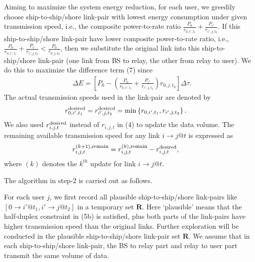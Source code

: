 \documentclass[journal]{IEEEtran}
\begin{document}
 Aiming to maximize the system energy reduction, for each user, we greedily choose ship-to-ship/shore link-pair with lowest energy consumption under given transmission speed, i.e., the composite power-to-rate ratio $ {\frac{{{P_0}}}{{{r_{0,i',{t_1}}}}} + \frac{{{P_{i'}}}}{{{r_{i',j,{t_2}}}}}} $. If this ship-to-ship/shore link-pair have lower composite power-to-rate ratio, i.e., $ {\frac{{{P_0}}}{{{r_{0,i',{t_1}}}}} + \frac{{{P_{i'}}}}{{{r_{i',j,{t_2}}}}}} < \frac{{{P_0}}}{{{r_{0,j,{t_0}}}}}$, then we substitute the original link into this ship-to-ship/shore link-pair (one link from BS to relay, the other from relay to user). We do this to maximize the difference term (7) since 
 \begin{align}
   &\Delta E  = \left[ {P_0}- \left( {\frac{{{P_0}}}{{{r_{0,i',{t_1}}}}} + \frac{{{P_{i'}}}}{{{r_{i',j,{t_2}}}}}} \right){r_{0,j,{t_0}}} \right] \Delta \tau.
 \end{align}
The actual transmission speeds used in the link-pair are denoted by 
\begin{align}
&r_{0,i',{t_1}}^{\rm{desired}}=r_{i',j,{t_2}}^{\rm{desired}}=\min \left\{ r_{0,i',{t_1}},r_{i',j,{t_2}} \right\}. 
\end{align}
We also used $r_{i,j,{t}}^{\rm{desired}}$ instead of $r_{i,j,{t}}$ in (4) to update the data volume. 
The remaining available transmission speed for any link $i \to j @ t$ is expressed as
\begin{align}
 &r_{i,j,{t}}^{\left( k+1 \right),\rm{remain}} = r_{i,j,{t}}^{\left( k \right),\rm{remain}} - r_{i,j,{t}}^{\rm{desired}}, 
\end{align}
where $\left( k \right)$ denotes the $k^{th}$ update for link $i \to j @ t$. 

 The algorithm in step-2 is carried out as follows.
 
 For each user $j$, we first record all plausible ship-to-ship/shore link-pairs like $\left[ {0 \to i'@{t_1},i' \to j@{t_2}} \right]$ in a temporary set $\mathbf{R}$. Here `plausible' means that the half-duplex constraint in (5b) 
 is satisfied, plus both parts of the link-pairs have higher transmission speed than the original links. Further exploration will be conducted in the plausible ship-to-ship/shore link-pair set $\mathbf{R}$. We assume that in each ship-to-ship/shore link-pair, the BS to relay part and relay to user part transmit the same volume of data.
\end{document}
